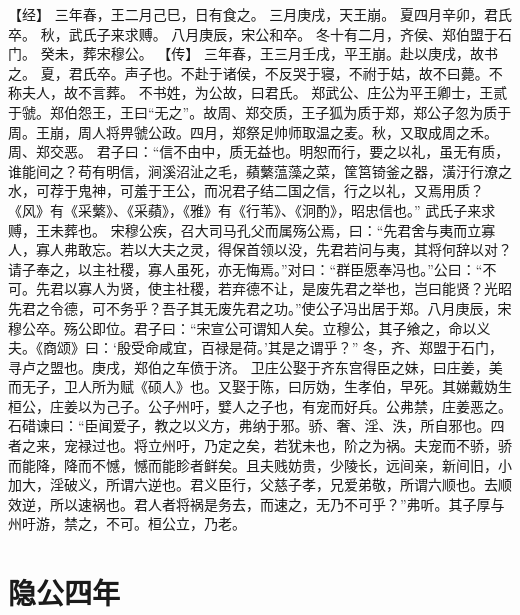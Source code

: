 \documentclass[a4paper,12pt,UTF8,twoside]{ctexbook}
\begin{document}
【经】
三年春，王二月己巳，日有食之。
三月庚戌，天王崩。
夏四月辛卯，君氏卒。
秋，武氏子来求赙。
八月庚辰，宋公和卒。
冬十有二月，齐侯、郑伯盟于石门。
癸未，葬宋穆公。
【传】
三年春，王三月壬戌，平王崩。赴以庚戌，故书之。
夏，君氏卒。声子也。不赴于诸侯，不反哭于寝，不祔于姑，故不曰薨。不称夫人，故不言葬。
不书姓，为公故，曰君氏。
郑武公、庄公为平王卿士，王贰于虢。郑伯怨王，王曰“无之”。故周、郑交质，王子狐为质于郑，郑公子忽为质于周。王崩，周人将畀虢公政。四月，郑祭足帅师取温之麦。秋，又取成周之禾。周、郑交恶。
君子曰：“信不由中，质无益也。明恕而行，要之以礼，虽无有质，谁能间之？苟有明信，涧溪沼沚之毛，蘋蘩蕰藻之菜，筐筥锜釜之器，潢汙行潦之水，可荐于鬼神，可羞于王公，而况君子结二国之信，行之以礼，又焉用质？《风》有《采蘩》、《采蘋》，《雅》有《行苇》、《泂酌》，昭忠信也。”
武氏子来求赙，王未葬也。
宋穆公疾，召大司马孔父而属殇公焉，曰：“先君舍与夷而立寡人，寡人弗敢忘。若以大夫之灵，得保首领以没，先君若问与夷，其将何辞以对？请子奉之，以主社稷，寡人虽死，亦无悔焉。”对曰：“群臣愿奉冯也。”公曰：“不可。先君以寡人为贤，使主社稷，若弃德不让，是废先君之举也，岂曰能贤？光昭先君之令德，可不务乎？吾子其无废先君之功。”使公子冯出居于郑。八月庚辰，宋穆公卒。殇公即位。君子曰：“宋宣公可谓知人矣。立穆公，其子飨之，命以义夫。《商颂》曰：‘殷受命咸宜，百禄是荷。’其是之谓乎？”
冬，齐、郑盟于石门，寻卢之盟也。庚戌，郑伯之车偾于济。
卫庄公娶于齐东宫得臣之妹，曰庄姜，美而无子，卫人所为赋《硕人》也。又娶于陈，曰厉妫，生孝伯，早死。其娣戴妫生桓公，庄姜以为己子。公子州吁，嬖人之子也，有宠而好兵。公弗禁，庄姜恶之。
石碏谏曰：“臣闻爱子，教之以义方，弗纳于邪。骄、奢、淫、泆，所自邪也。四者之来，宠禄过也。将立州吁，乃定之矣，若犹未也，阶之为祸。夫宠而不骄，骄而能降，降而不憾，憾而能眕者鲜矣。且夫贱妨贵，少陵长，远间亲，新间旧，小加大，淫破义，所谓六逆也。君义臣行，父慈子孝，兄爱弟敬，所谓六顺也。去顺效逆，所以速祸也。君人者将祸是务去，而速之，无乃不可乎？”弗听。其子厚与州吁游，禁之，不可。桓公立，乃老。

\section{隐公四年}
\end{document}
